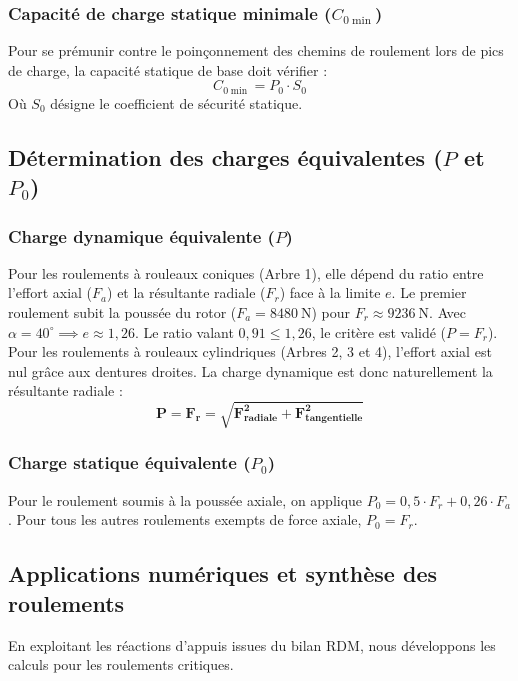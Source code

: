 \documentclass[11pt,a4paper]{article}
\begin{document}
\subsubsection*{Capacité de charge statique minimale ($C_{0\min}$)}
Pour se prémunir contre le poinçonnement des chemins de roulement lors de pics de charge, la capacité statique de base doit vérifier :
\[ C_{0\min} = P_0 \cdot S_0 \]
Où $S_0$ désigne le coefficient de sécurité statique.

\subsection{Détermination des charges équivalentes (\texorpdfstring{$P$ et $P_0$}{P et P0})}

\subsubsection*{Charge dynamique équivalente ($P$)}
Pour les roulements à rouleaux coniques (Arbre 1), elle dépend du ratio entre l'effort axial ($F_a$) et la résultante radiale ($F_r$) face à la limite $e$. Le premier roulement subit la poussée du rotor ($F_a = \qty{8480}{\newton}$) pour $F_r \approx \qty{9236}{\newton}$. Avec $\alpha = 40^\circ \implies e \approx 1{,}26$. Le ratio valant $0{,}91 \le 1{,}26$, le critère est validé ($P=F_r$).
Pour les roulements à rouleaux cylindriques (Arbres 2, 3 et 4), l'effort axial est nul grâce aux dentures droites. La charge dynamique est donc naturellement la résultante radiale :
\[ \mathbf{P = F_r = \sqrt{F_{\text{radiale}}^2 + F_{\text{tangentielle}}^2}} \]

\subsubsection*{Charge statique équivalente ($P_0$)}
Pour le roulement soumis à la poussée axiale, on applique $P_0 = 0{,}5 \cdot F_r + 0{,}26 \cdot F_a$. Pour tous les autres roulements exempts de force axiale, $P_0 = F_r$.

\subsection{Applications numériques et synthèse des roulements}

En exploitant les réactions d'appuis issues du bilan RDM, nous développons les calculs pour les roulements critiques.
\end{document}
